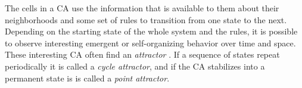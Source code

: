 The cells in a CA use the information that is available to them about their neighborhoods and some set of rules to transition from one state to the next.
Depending on the starting state of the whole system and the rules,
it is possible to observe interesting emergent or self-organizing behavior over time and space.
These interesting CA often find an \textit{attractor} \cite{gershenson-2004, wolfram1986theory}.
If a sequence of states repeat periodically it is called a \textit{cycle attractor}, and if the CA stabilizes into a permanent state is is called a \textit{point attractor}.



%

